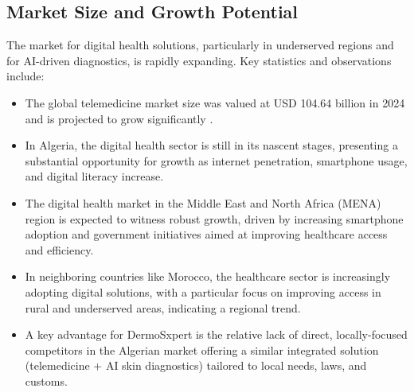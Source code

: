 \subsection{Market Size and Growth Potential}
The market for digital health solutions, particularly in underserved regions and for AI-driven diagnostics, is rapidly expanding. Key statistics and observations include:
\begin{itemize}
    \item The global telemedicine market size was valued at USD 104.64 billion in 2024 and is projected to grow significantly \cite{fortune2024telemedicine}.
    \item In Algeria, the digital health sector is still in its nascent stages, presenting a substantial opportunity for growth as internet penetration, smartphone usage, and digital literacy increase.
    \item The digital health market in the Middle East and North Africa (MENA) region is expected to witness robust growth, driven by increasing smartphone adoption and government initiatives aimed at improving healthcare access and efficiency.
    \item In neighboring countries like Morocco, the healthcare sector is increasingly adopting digital solutions, with a particular focus on improving access in rural and underserved areas, indicating a regional trend.
    \item A key advantage for DermoSxpert is the relative lack of direct, locally-focused competitors in the Algerian market offering a similar integrated solution (telemedicine + AI skin diagnostics) tailored to local needs, laws, and customs.
\end{itemize}


